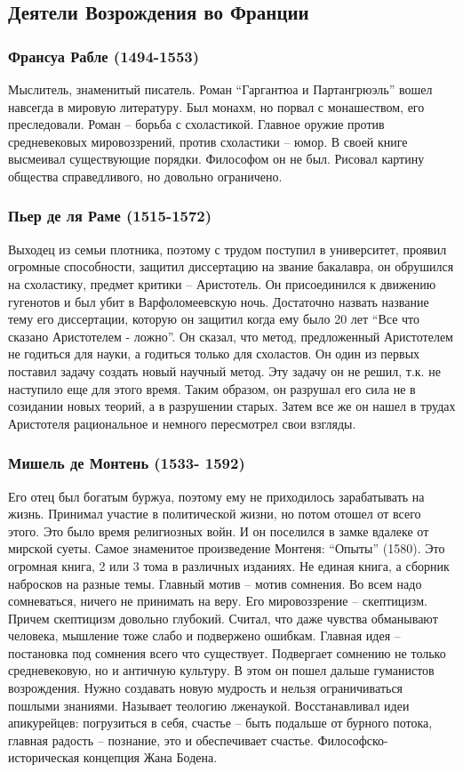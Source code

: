 \subsection{Деятели Возрождения во Франции}
\subsubsection{Франсуа Рабле (1494-1553)}

Мыслитель, знаменитый писатель. Роман “Гаргантюа и Партангрюэль” вошел навсегда в мировую литературу. Был монахм, но порвал с монашеством, его преследовали. Роман – борьба с схоластикой. Главное оружие против средневековых мировоззрений, против схоластики – юмор. В своей книге высмеивал существующие порядки. Философом он не был. Рисовал картину общества справедливого, но довольно ограничено.
\subsubsection{Пьер де ля Раме (1515-1572)}

Выходец из семьи плотника, поэтому с трудом поступил в университет, проявил огромные способности, защитил диссертацию на звание бакалавра, он обрушился на схоластику, предмет критики – Аристотель. Он присоединился к движению гугенотов и был убит в Варфоломеевскую ночь. Достаточно назвать название тему его диссертации, которую он защитил когда ему было 20 лет “Все что сказано Аристотелем - ложно”. Он сказал, что метод, предложенный Аристотелем не годиться для науки, а годиться только для схоластов. Он один из первых поставил задачу создать новый научный метод. Эту задачу он не решил, т.к. не наступило еще для этого время. Таким образом, он разрушал его сила не в созидании новых теорий, а в разрушении старых. Затем все же он нашел в трудах Аристотеля рациональное и немного пересмотрел свои взгляды.
\subsubsection{Мишель де Монтень (1533- 1592)}

Его отец был богатым буржуа, поэтому ему не приходилось зарабатывать на жизнь. Принимал участие в политической жизни, но потом отошел от всего этого. Это было время религиозных войн. И он поселился в замке вдалеке от мирской суеты. Самое знаменитое произведение Монтеня: “Опыты” (1580). Это огромная книга, 2 или 3 тома в различных изданиях. Не единая книга, а сборник набросков на разные темы. Главный мотив – мотив сомнения. Во всем надо сомневаться, ничего не принимать на веру. Его мировоззрение – скептицизм. Причем скептицизм довольно глубокий. Считал, что даже чувства обманывают человека, мышление тоже слабо и подвержено ошибкам. Главная идея – постановка под сомнения всего что существует. Подвергает сомнению не только средневековую, но и античную культуру. В этом он пошел дальше гуманистов возрождения. Нужно создавать новую мудрость и нельзя ограничиваться пошлыми знаниями. Называет теологию лженаукой. Восстанавливал идеи апикурейцев: погрузиться в себя, счастье – быть подальше от бурного потока, главная радость – познание, это и обеспечивает счастье.
Философско-историческая концепция Жана Бодена.

